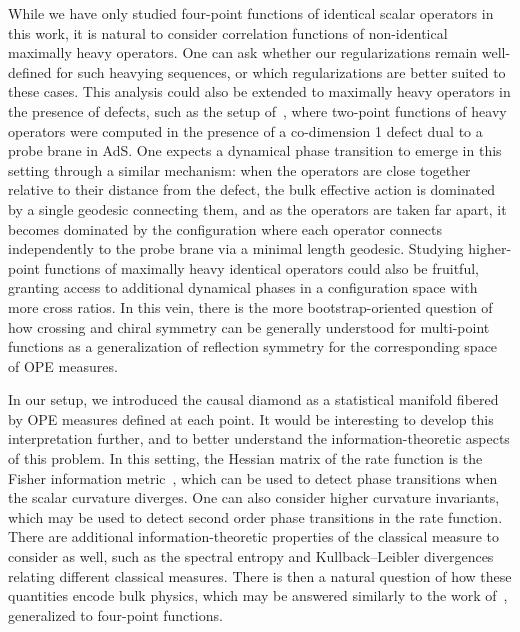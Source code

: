 \documentclass[a4paper,11pt]{article}
\theoremstyle{plain}
\theoremstyle{definition}
\theoremstyle{remark}
\begin{document}
While we have only studied four-point functions of identical scalar operators in this work, it is natural to consider correlation functions of non-identical maximally heavy operators. One can ask whether our regularizations remain well-defined for such heavying sequences, or which regularizations are better suited to these cases. This analysis could also be extended to maximally heavy operators in the presence of defects, such as the setup of~\cite{Linardopoulos:2026mut}, where two-point functions of heavy operators were computed in the presence of a co-dimension 1 defect dual to a probe brane in AdS. One expects a dynamical phase transition to emerge in this setting through a similar mechanism: when the operators are close together relative to their distance from the defect, the bulk effective action is dominated by a single geodesic connecting them, and as the operators are taken far apart, it becomes dominated by the configuration where each operator connects independently to the probe brane via a minimal length geodesic. Studying higher-point functions of maximally heavy identical operators could also be fruitful, granting access to additional dynamical phases in a configuration space with more cross ratios. In this vein, there is the more bootstrap-oriented question of how crossing and chiral symmetry can be generally understood for multi-point functions as a generalization of reflection symmetry for the corresponding space of OPE measures.

In our setup, we introduced the causal diamond as a statistical manifold fibered by OPE measures defined at each point. It would be interesting to develop this interpretation further, and to better understand the information-theoretic aspects of this problem. In this setting, the Hessian matrix of the rate function is the Fisher information metric~\cite{Ruppeiner:1995zz,Amari:2000ig}, which can be used to detect phase transitions when the scalar curvature diverges. One can also consider higher curvature invariants, which may be used to detect second order phase transitions in the rate function. There are additional information-theoretic properties of the classical measure to consider as well, such as the spectral entropy and Kullback--Leibler divergences relating different classical measures. There is then a natural question of how these quantities encode bulk physics, which may be answered similarly to the work of~\cite{Bohra:2021zyw}, generalized to four-point functions.
\end{document}
